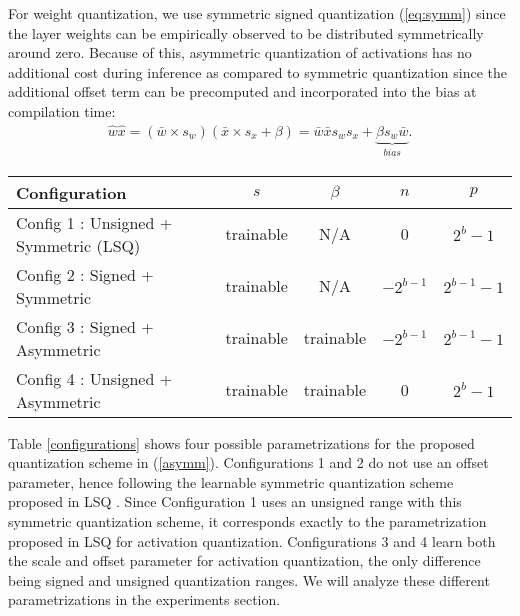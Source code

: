 \documentclass[10pt,twocolumn,letterpaper]{article}
\begin{document}
For weight quantization, we use symmetric signed quantization (\ref{eq:symm}) since the layer weights can be empirically observed to be distributed symmetrically around zero. Because of this, asymmetric quantization of activations has no additional cost during inference as compared to symmetric quantization since the additional offset term can be precomputed and incorporated into the bias at compilation time:
\begin{align}
\label{eq:overhead}
\hat{w}\hat{x}=(\bar{w}\times s_w)(\bar{x}\times s_x+\beta)=\bar{w}\bar{x}s_w s_x+\underbrace{\beta s_w \bar{w}}_{bias}.    
\end{align}

\begin{table*}[t]
	\caption{Different possible parametrizations for LSQ+'s learnable asymmetric quantization scheme}
\centering
	\begin{tabular}{l | c| c | c | c}
        \toprule
        	{Configuration} & {$s$} & {$\beta$} & {$n$} & {$p$} \\
			
			\midrule
	
			Config 1 : Unsigned + Symmetric (LSQ) & trainable & N/A & 0 & $2^{b}-1$\\
			Config 2 : Signed + Symmetric & trainable & N/A & $-2^{b-1}$ & $2^{b-1}-1$  \\
			Config 3 : Signed + Asymmetric & trainable & trainable & $-2^{b-1}$ & $2^{b-1}-1$ \\
			Config 4 : Unsigned + Asymmetric & trainable & trainable & 0 & $2^{b}-1$ \\
        \bottomrule
	\end{tabular}
	\label{configurations}
\end{table*}

Table \ref{configurations} shows four possible parametrizations for the proposed quantization scheme in (\ref{asymm}). Configurations 1 and 2 do not use an offset parameter, hence following the learnable symmetric quantization scheme proposed in LSQ \cite{lsq}. Since Configuration 1 uses an unsigned range with this symmetric quantization scheme, it corresponds exactly to the parametrization proposed in LSQ for activation quantization. 
Configurations 3 and 4 learn both the scale and offset parameter for activation quantization, the only difference being signed and unsigned quantization ranges. We will analyze these different parametrizations in the experiments section. 
\end{document}
